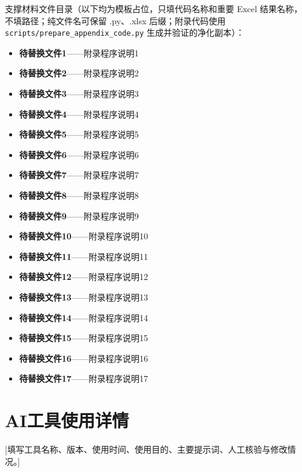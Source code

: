\documentclass{JXUSTmodeling}
\begin{document}
\clearpage
\label{appendix:start}
\begin{appendixx}
\par\noindent\hspace{2em}支撑材料文件目录（以下均为模板占位，只填代码名称和重要 Excel 结果名称，不填路径；纯文件名可保留 .py、.xlsx 后缀；附录代码使用 \texttt{scripts/prepare\_appendix\_code.py} 生成并验证的净化副本）：\par

\newcommand{\AppendixCodeName}[1]{待替换文件#1}

\begin{itemize}[label={},leftmargin=1.9em,itemsep=0.25em,topsep=0.25em]
    \item \textbf{\AppendixCodeName{1}}——附录程序说明1
    \item \textbf{\AppendixCodeName{2}}——附录程序说明2
    \item \textbf{\AppendixCodeName{3}}——附录程序说明3
    \item \textbf{\AppendixCodeName{4}}——附录程序说明4
    \item \textbf{\AppendixCodeName{5}}——附录程序说明5
    \item \textbf{\AppendixCodeName{6}}——附录程序说明6
    \item \textbf{\AppendixCodeName{7}}——附录程序说明7
    \item \textbf{\AppendixCodeName{8}}——附录程序说明8
    \item \textbf{\AppendixCodeName{9}}——附录程序说明9
    \item \textbf{\AppendixCodeName{10}}——附录程序说明10
    \item \textbf{\AppendixCodeName{11}}——附录程序说明11
    \item \textbf{\AppendixCodeName{12}}——附录程序说明12
    \item \textbf{\AppendixCodeName{13}}——附录程序说明13
    \item \textbf{\AppendixCodeName{14}}——附录程序说明14
    \item \textbf{\AppendixCodeName{15}}——附录程序说明15
    \item \textbf{\AppendixCodeName{16}}——附录程序说明16
    \item \textbf{\AppendixCodeName{17}}——附录程序说明17
\end{itemize}



\section*{AI工具使用详情}
[填写工具名称、版本、使用时间、使用目的、主要提示词、人工核验与修改情况。]
\end{appendixx}
\end{document}
